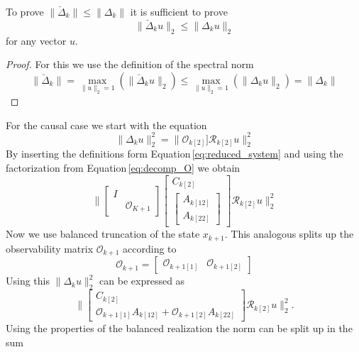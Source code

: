 \documentclass[doctype=mastersthesis,BCOR=15mm,biblatex]{ldvbook}%
\newcommand{\R}{\mathcal{R}} %
\newcommand{\Ob}{\mathcal{O}} %
\newcommand{\eye}{I} %
\begin{document}
To prove $\|\breve{\Delta}_k\| \leq \|\Delta_k\|$ it is sufficient to prove
\begin{equation}\label{eq:A_breve_leq_delta}
	\|\breve{\Delta}_k u\|_2 \leq \|\Delta_k u\|_2 
\end{equation}
for any vector $u$.
\begin{proof}
	For this we use the definition of the spectral norm
	\begin{equation}
		\|\breve{\Delta}_k\| =
		\underset{\|u\|_2 = 1}{\max}(\|\breve{\Delta}_k u\|_2)
		\leq 
		\underset{\|u\|_2 = 1}{\max}(\|\Delta_k u\|_2)
		=\|\Delta_k\|
	\end{equation}
\end{proof}

For the causal case we start with the equation
\begin{equation}
	\|\Delta_k u\|_2^2 = \|\Ob_{k[2]}] \R_{k[2]} u\|_2^2
\end{equation}
By inserting the definitions form Equation\,\ref{eq:reduced_system} and using the factorization from Equation\,\ref{eq:decomp_O} we obtain 
\begin{equation}
	\Bigg\|
	\begin{bmatrix}
	\eye & \\
	& \Ob_{K+1}
	\end{bmatrix}
	\begin{bmatrix}
	C_{k[2]}\\
	\begin{bmatrix}
	A_{k[12]}\\
	A_{k[22]}
	\end{bmatrix}
	\end{bmatrix}  \R_{k[2]} u\Bigg\|_2^2
\end{equation}
Now we use balanced truncation of the state $x_{k+1}$.
This analogous splits up the observability matrix $\Ob_{k+1}$ according to
\begin{equation}
	\Ob_{k+1} = 
	\begin{bmatrix}
	\Ob_{k+1[1]} & \Ob_{k+1[2]}
	\end{bmatrix}
\end{equation}
Using this $\|\Delta_k u\|_2^2$ can be expressed as
\begin{equation}
	\Bigg\|
\begin{bmatrix}
C_{k[2]}\\
\Ob_{k+1[1]}A_{k[12]}+
\Ob_{k+1[2]}A_{k[22]}
\end{bmatrix}  \R_{k[2]} u\Bigg\|_2^2
.
\end{equation}
Using the properties of the balanced realization the norm can be split up in the sum
\end{document}
